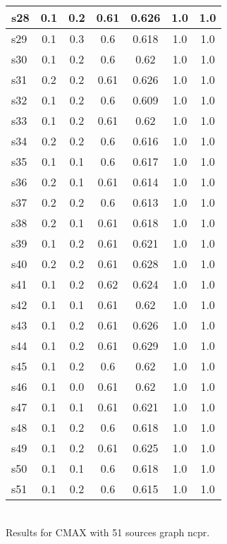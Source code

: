 \documentclass{article}
\begin{document}
\begin{tabular}{|l|c|c|c|c|c|c|}
\hline
s28 &0.1 & 0.2 & 0.61 & 0.626 & 1.0 & 1.0\\
\hline
s29 &0.1 & 0.3 & 0.6 & 0.618 & 1.0 & 1.0\\
\hline
s30 &0.1 & 0.2 & 0.6 & 0.62 & 1.0 & 1.0\\
\hline
s31 &0.2 & 0.2 & 0.61 & 0.626 & 1.0 & 1.0\\
\hline
s32 &0.1 & 0.2 & 0.6 & 0.609 & 1.0 & 1.0\\
\hline
s33 &0.1 & 0.2 & 0.61 & 0.62 & 1.0 & 1.0\\
\hline
s34 &0.2 & 0.2 & 0.6 & 0.616 & 1.0 & 1.0\\
\hline
s35 &0.1 & 0.1 & 0.6 & 0.617 & 1.0 & 1.0\\
\hline
s36 &0.2 & 0.1 & 0.61 & 0.614 & 1.0 & 1.0\\
\hline
s37 &0.2 & 0.2 & 0.6 & 0.613 & 1.0 & 1.0\\
\hline
s38 &0.2 & 0.1 & 0.61 & 0.618 & 1.0 & 1.0\\
\hline
s39 &0.1 & 0.2 & 0.61 & 0.621 & 1.0 & 1.0\\
\hline
s40 &0.2 & 0.2 & 0.61 & 0.628 & 1.0 & 1.0\\
\hline
s41 &0.1 & 0.2 & 0.62 & 0.624 & 1.0 & 1.0\\
\hline
s42 &0.1 & 0.1 & 0.61 & 0.62 & 1.0 & 1.0\\
\hline
s43 &0.1 & 0.2 & 0.61 & 0.626 & 1.0 & 1.0\\
\hline
s44 &0.1 & 0.2 & 0.61 & 0.629 & 1.0 & 1.0\\
\hline
s45 &0.1 & 0.2 & 0.6 & 0.62 & 1.0 & 1.0\\
\hline
s46 &0.1 & 0.0 & 0.61 & 0.62 & 1.0 & 1.0\\
\hline
s47 &0.1 & 0.1 & 0.61 & 0.621 & 1.0 & 1.0\\
\hline
s48 &0.1 & 0.2 & 0.6 & 0.618 & 1.0 & 1.0\\
\hline
s49 &0.1 & 0.2 & 0.61 & 0.625 & 1.0 & 1.0\\
\hline
s50 &0.1 & 0.1 & 0.6 & 0.618 & 1.0 & 1.0\\
\hline
s51 &0.1 & 0.2 & 0.6 & 0.615 & 1.0 & 1.0\\
\hline
\end{tabular}\\

\noindent Results for CMAX with 51 sources graph ncpr.
\end{document}
